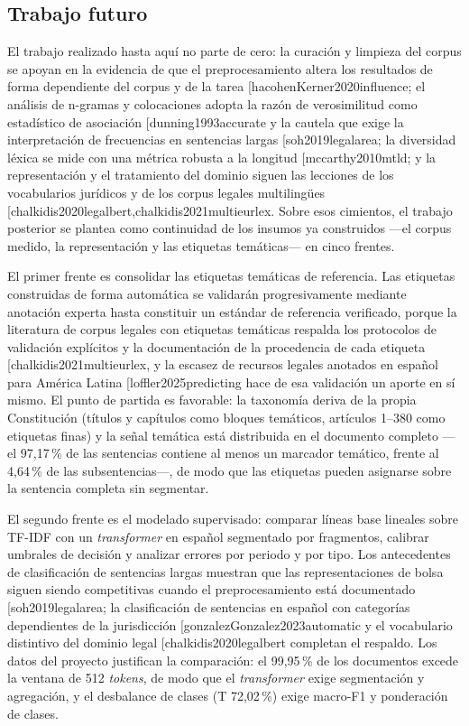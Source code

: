 \documentclass[11pt]{tg_usta}
\makeatletter
\renewcommand{\cite}{\@ifnextchar[{\@tempswatrue\@citex}{\@tempswafalse\@citex[]}}
\makeatother
\begin{document}
\subsection{Trabajo futuro}
El trabajo realizado hasta aquí no parte de cero: la curación y limpieza del corpus se apoyan en la evidencia de que el preprocesamiento altera los resultados de forma dependiente del corpus y de la tarea \cite{hacohenKerner2020influence}; el análisis de n-gramas y colocaciones adopta la razón de verosimilitud como estadístico de asociación \cite{dunning1993accurate} y la cautela que exige la interpretación de frecuencias en sentencias largas \cite{soh2019legalarea}; la diversidad léxica se mide con una métrica robusta a la longitud \cite{mccarthy2010mtld}; y la representación y el tratamiento del dominio siguen las lecciones de los vocabularios jurídicos y de los corpus legales multilingües \cite{chalkidis2020legalbert,chalkidis2021multieurlex}. Sobre esos cimientos, el trabajo posterior se plantea como continuidad de los insumos ya construidos ---el corpus medido, la representación y las etiquetas temáticas--- en cinco frentes.

El primer frente es consolidar las etiquetas temáticas de referencia. Las etiquetas construidas de forma automática se validarán progresivamente mediante anotación experta hasta constituir un estándar de referencia verificado, porque la literatura de corpus legales con etiquetas temáticas respalda los protocolos de validación explícitos y la documentación de la procedencia de cada etiqueta \cite{chalkidis2021multieurlex}, y la escasez de recursos legales anotados en español para América Latina \cite{loffler2025predicting} hace de esa validación un aporte en sí mismo. El punto de partida es favorable: la taxonomía deriva de la propia Constitución (títulos y capítulos como bloques temáticos, artículos 1--380 como etiquetas finas) y la señal temática está distribuida en el documento completo ---el 97,17\,\% de las sentencias contiene al menos un marcador temático, frente al 4,64\,\% de las subsentencias---, de modo que las etiquetas pueden asignarse sobre la sentencia completa sin segmentar.

El segundo frente es el modelado supervisado: comparar líneas base lineales sobre TF-IDF con un \emph{transformer} en español segmentado por fragmentos, calibrar umbrales de decisión y analizar errores por periodo y por tipo. Los antecedentes de clasificación de sentencias largas muestran que las representaciones de bolsa siguen siendo competitivas cuando el preprocesamiento está documentado \cite{soh2019legalarea}; la clasificación de sentencias en español con categorías dependientes de la jurisdicción \cite{gonzalezGonzalez2023automatic} y el vocabulario distintivo del dominio legal \cite{chalkidis2020legalbert} completan el respaldo. Los datos del proyecto justifican la comparación: el 99,95\,\% de los documentos excede la ventana de 512 \emph{tokens}, de modo que el \emph{transformer} exige segmentación y agregación, y el desbalance de clases (T 72,02\,\%) exige macro-F1 y ponderación de clases.
\end{document}
